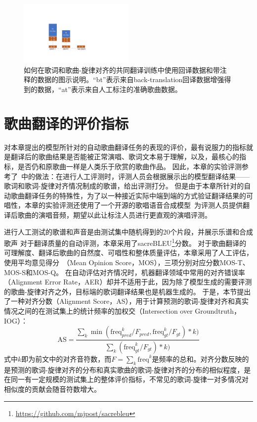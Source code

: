\begin{figure}[htbp]
    \centering
    \includegraphics[width=0.5\textwidth]{figure/ast/backtrans_curriculum.pdf}
    \caption{如何在歌词和歌曲-旋律对齐的共同翻译训练中使用回译数据和带注释的数据的图示说明。``bt''表示来自back-translation回译数据增强得到的数据，``at''表示来自人工标注的准确歌曲数据。}
    \label{fig:bt_curriculum}
\end{figure}
\section{歌曲翻译的评价指标}
\label{sec:metric}
对本章提出的模型所针对的自动歌曲翻译任务的表现的评价，最有说服力的指标就是翻译后的歌曲结果是否能被正常演唱、歌词文本易于理解，以及，最核心的指标，是否仍和原歌曲一样是人类乐于欣赏的歌曲作品。
因此，本章的实验评测参考了\citet{songmass}~中的做法：在进行人工评测时，评测人员会根据展示出的模型翻译结果——歌词和歌词-旋律对齐情况制成的歌谱，给出评测打分。
但是由于本章所针对的自动歌曲翻译任务的特殊性，为了以一种接近实际中端到端的方式验证翻译结果的可唱性，本章的实验评测还使用了一个开源的歌唱语音合成模型~\citep{diffsinger}为评测人员提供翻译后歌曲的演唱音频，期望以此让标注人员进行更直观的演唱评测。

进行人工测试的歌谱和声音是由测试集中随机得到的20个片段，并展示乐谱和合成歌声
对于翻译质量的自动评测，本章采用了sacreBLEU\footnote{\url{https://github.com/mjpost/sacrebleu}}分数。
对于歌曲翻译的可理解度、翻译后歌曲的自然度、可唱性和整体质量评估，本章采用了人工评估，使用平均意见得分~（Mean Opinion Score，MOS），三项分别对应分数MOS-T、MOS-S和MOS-Q。
在自动评估对齐情况时，机器翻译领域中常用的对齐错误率（Alignment Error Rate，AER）却并不适用于此，因为除了模型生成的需要评测的歌曲-旋律对齐之外，目标端的歌词翻译结果也是机器生成的。
于是，本节提出了一种对齐分数（Alignment Score，AS），用于计算预测的歌词-旋律对齐和真实情况之间的在测试集上的统计频率的加权交（Intersection over Groundtruth，IOG）：
\begin{equation}
    \text{AS} = \frac{\sum_{k}\min(\text{freq}_{pred}^k/F_{pred}, \text{freq}_{gt}^k/F_{gt}) * k)}{\sum_{k} (\text{freq}_{gt}^k/F_{gt}) * k) }
\end{equation}
式中$k$即为前文中的对齐音符数，而$F = \sum_{k} \text{freq}^k$是频率的总和。对齐分数反映的是预测的歌词-旋律对齐的分布和真实歌曲的歌词-旋律对齐的分布的相似程度，是在同一有一定规模的测试集上的整体评价指标，不常见的歌词-旋律一对多情况对相似度的贡献会随音符数增大。
